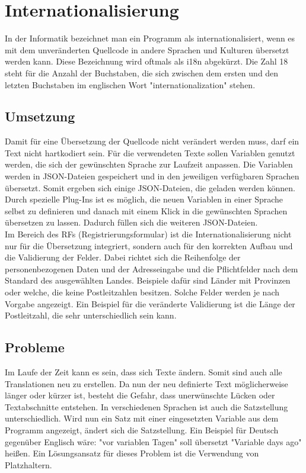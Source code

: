 \chapter{Internationalisierung}
In der Informatik bezeichnet man ein Programm als internationalisiert, wenn es mit dem unveränderten Quellcode in andere Sprachen und Kulturen übersetzt werden kann. Diese Bezeichnung wird oftmals als i18n abgekürzt. Die Zahl 18 steht für die Anzahl der Buchstaben, die sich zwischen dem ersten und den letzten Buchstaben im englischen Wort "internationalization" stehen. \autocite{wikii18n}
\section{Umsetzung}
Damit für eine Übersetzung der Quellcode nicht verändert werden muss, darf ein Text nicht hartkodiert sein. Für die verwendeten Texte sollen Variablen genutzt werden, die sich der gewünschten Sprache zur Laufzeit anpassen. Die Variablen werden in JSON-Dateien gespeichert und in den jeweiligen verfügbaren Sprachen übersetzt. Somit ergeben sich einige JSON-Dateien, die geladen werden können. Durch spezielle Plug-Ins ist es möglich, die neuen Variablen in einer Sprache selbst zu definieren und danach mit einem Klick in die gewünschten Sprachen übersetzen zu lassen. Dadurch füllen sich die weiteren JSON-Dateien.\autocite{wikii18n}\\
Im Bereich des RFs (Registrierungsformular) ist die Internationalisierung nicht nur für die Übersetzung integriert, sondern auch für den korrekten Aufbau und die Validierung der Felder. Dabei richtet sich die Reihenfolge der personenbezogenen Daten und der Adresseingabe und die Pflichtfelder nach dem Standard des ausgewählten Landes. Beispiele dafür sind Länder mit Provinzen oder welche, die keine Postleitzahlen besitzen. Solche Felder werden je nach Vorgabe angezeigt. Ein Beispiel für die veränderte Validierung ist die Länge der Postleitzahl, die sehr unterschiedlich sein kann.\autocite{wikii18n}
\section{Probleme}
Im Laufe der Zeit kann es sein, dass sich Texte ändern. Somit sind auch alle Translationen neu zu erstellen. Da nun der neu definierte Text möglicherweise länger oder kürzer ist, besteht die Gefahr, dass unerwünschte Lücken oder Textabschnitte entstehen. In verschiedenen Sprachen ist auch die Satzstellung unterschiedlich. Wird nun ein Satz mit einer eingesetzten Variable aus dem Programm angezeigt, ändert sich die Satzstellung. Ein Beispiel für Deutsch gegenüber Englisch wäre: "vor {variablen} Tagen" soll übersetzt "{Variable} days ago" heißen. Ein Lösungsansatz für dieses Problem ist die Verwendung von Platzhaltern.\autocite{wikii18n}